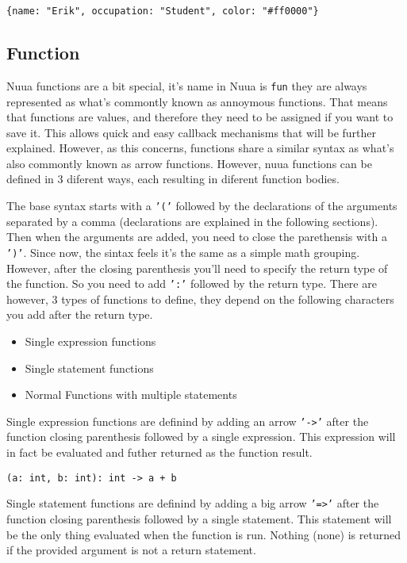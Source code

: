 \begin{center}
    \texttt{\{name: "Erik", occupation: "Student", color: "\#ff0000"\}}
\end{center}

\subsection{Function}

Nuua functions are a bit special, it's name in Nuua is \texttt{fun} they are always represented as what's commontly known as annoymous functions. That means
that functions are values, and therefore they need to be assigned if you want to save it. This allows quick and easy callback
mechanisms that will be further explained. However, as this concerns, functions share a similar syntax as what's also commontly
known as arrow functions. However, nuua functions can be defined in 3 diferent ways, each resulting in diferent function bodies.

The base syntax starts with a \texttt{'('} followed by the declarations of the arguments separated by a comma (declarations are explained in
the following sections). Then when the arguments are added, you need to close the parethensis with a \texttt{')'}.
Since now, the sintax feels it's the same as a simple math grouping. However, after the closing parenthesis you'll need to specify
the return type of the function. So you need to add \texttt{':'} followed by the return type. There are however, 3 types of functions
to define, they depend on the following characters you add after the return type.

\begin{itemize}
    \item Single expression functions
    \item Single statement functions
    \item Normal Functions with multiple statements
\end{itemize}

Single expression functions are definind by adding an arrow \texttt{'->'} after the function closing parenthesis followed by a
single expression. This expression will in fact be evaluated and futher returned as the function result.

\begin{center}
    \texttt{(a: int, b: int): int -> a + b}
\end{center}

Single statement functions are definind by adding a big arrow \texttt{'=>'} after the function closing parenthesis followed by a
single statement. This statement will be the only thing evaluated when the function is run. Nothing (none) is returned if the provided
argument is not a return statement.

